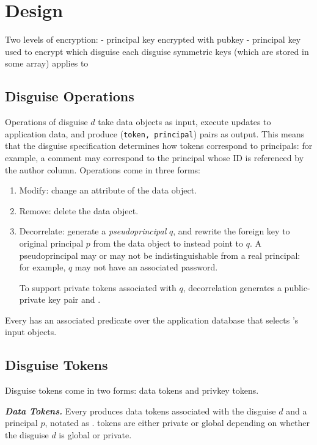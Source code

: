\section{Design} 

Two levels of encryption: 
- principal key encrypted with pubkey
- principal key used to encrypt which disguise each disguise symmetric keys (which are stored in some array) applies to

\subsection{Disguise Operations} 
Operations  of disguise $d$ take data objects as input, execute updates to application
data, and produce (\texttt{token, principal}) pairs
as output. This means that the disguise specification determines how tokens correspond to
principals: for example, a comment may correspond to the principal whose ID is referenced by the
author column.
Operations come in three forms:
\begin{enumerate}
    \item Modify: change an attribute of the data object.
    \item Remove: delete the data object.
    \item Decorrelate: generate a \emph{pseudoprincipal} $q$, and rewrite the foreign key to original
        principal $p$ from the data object to instead point to $q$.
        A pseudoprincipal may or may not be indistinguishable from a real principal: for example,
        $q$ may not have an associated password.

        To support private tokens associated with $q$, decorrelation generates a
        public-private key pair  and .
\end{enumerate}
Every  has an associated predicate over the application database that selects 's input objects.

\subsection{Disguise Tokens} 
Disguise tokens come in two forms: data tokens and privkey tokens.

\vspace{6pt}
\noindent\textbf{\emph{Data Tokens.}}
Every  produces data tokens associated with the disguise $d$ and a
principal $p$, notated as .  tokens are either private or global depending on
whether the disguise $d$ is global or private. 

